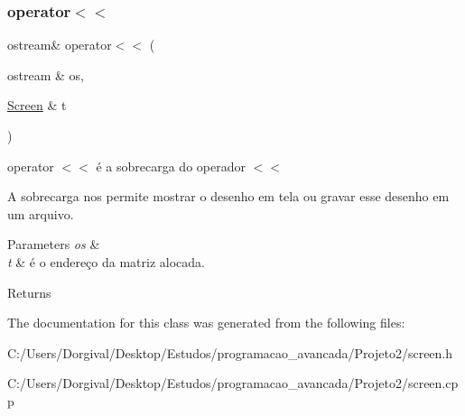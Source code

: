 \subsubsection{\texorpdfstring{operator$<$$<$}{operator<<}}
{\footnotesize\ttfamily ostream\& operator$<$$<$ (\begin{DoxyParamCaption}\item[{ostream \&}]{os,  }\item[{\mbox{\hyperlink{class_screen}{Screen}} \&}]{t }\end{DoxyParamCaption})\hspace{0.3cm}{\ttfamily [friend]}}



operator $<$$<$ é a sobrecarga do operador $<$$<$ 

A sobrecarga nos permite mostrar o desenho em tela ou gravar esse desenho em um arquivo. 
\begin{DoxyParams}{Parameters}
{\em os} & \\
\hline
{\em t} & é o endereço da matriz alocada. \\
\hline
\end{DoxyParams}
\begin{DoxyReturn}{Returns}

\end{DoxyReturn}


The documentation for this class was generated from the following files\+:\begin{DoxyCompactItemize}
\item 
C\+:/\+Users/\+Dorgival/\+Desktop/\+Estudos/programacao\+\_\+avancada/\+Projeto2/screen.\+h\item 
C\+:/\+Users/\+Dorgival/\+Desktop/\+Estudos/programacao\+\_\+avancada/\+Projeto2/screen.\+cpp\end{DoxyCompactItemize}
